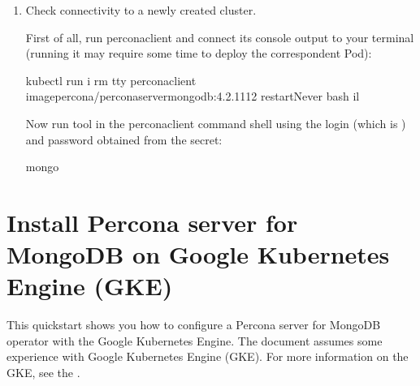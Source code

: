 \documentclass[letterpaper,10pt,english]{sphinxmanual}
\begin{document}
\begin{enumerate}
\begin{sphinxVerbatim}[commandchars=\\\{\}]
   
   
\end{sphinxVerbatim}

Here the actual login name and password are base64\sphinxhyphen{}encoded, and
 will bring it back to a
human\sphinxhyphen{}readable form.

\item {} 
Check connectivity to a newly created cluster.

First of all, run percona\sphinxhyphen{}client and connect its console output to your
terminal (running it may require some time to deploy the correspondent Pod):

\begin{sphinxVerbatim}[commandchars=\\\{\}]
kubectl run \PYGZhy{}i \PYGZhy{}\PYGZhy{}rm \PYGZhy{}\PYGZhy{}tty percona\PYGZhy{}client \PYGZhy{}\PYGZhy{}imagepercona/percona\PYGZhy{}server\PYGZhy{}mongodb:4.2.11\PYGZhy{}12 \PYGZhy{}\PYGZhy{}restartNever \PYGZhy{}\PYGZhy{} bash \PYGZhy{}il
\end{sphinxVerbatim}

Now run  tool in the percona\sphinxhyphen{}client command shell using the login
(which is ) and password obtained from the secret:

\begin{sphinxVerbatim}[commandchars=\\\{\}]
mongo 
\end{sphinxVerbatim}

\end{enumerate}


\chapter{Install Percona server for MongoDB on Google Kubernetes Engine (GKE)}
\label{\detokenize{gke:install-percona-server-for-mongodb-on-google-kubernetes-engine-gke}}\label{\detokenize{gke::doc}}
This quickstart shows you how to configure a Percona server for MongoDB operator with the Google Kubernetes Engine. The document assumes some experience with Google Kubernetes Engine (GKE). For more information on the GKE, see the .
\end{document}
